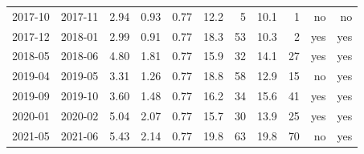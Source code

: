 \begin{table}[htbp]
\begin{tabular}{lrrrrrrrrrr}
2017-10 & 2017-11 & 2.94 & 0.93 & 0.77 & 12.2 & 5 & 10.1 & 1 & no & no \\
2017-12 & 2018-01 & 2.99 & 0.91 & 0.77 & 18.3 & 53 & 10.3 & 2 & yes & yes \\
2018-05 & 2018-06 & 4.80 & 1.81 & 0.77 & 15.9 & 32 & 14.1 & 27 & yes & yes \\
2019-04 & 2019-05 & 3.31 & 1.26 & 0.77 & 18.8 & 58 & 12.9 & 15 & no & yes \\
2019-09 & 2019-10 & 3.60 & 1.48 & 0.77 & 16.2 & 34 & 15.6 & 41 & yes & yes \\
2020-01 & 2020-02 & 5.04 & 2.07 & 0.77 & 15.7 & 30 & 13.9 & 25 & yes & yes \\
2021-05 & 2021-06 & 5.43 & 2.14 & 0.77 & 19.8 & 63 & 19.8 & 70 & no & yes \\
\bottomrule
\end{tabular}
\end{table}
